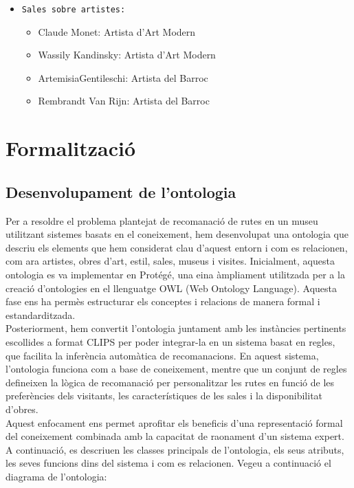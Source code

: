 \documentclass[a4paper]{article}
\begin{document}
	\begin{itemize}
		\item \texttt{Sales sobre artistes: } 
		\begin{itemize}
			\item Claude Monet: Artista d'Art Modern
			\item Wassily Kandinsky: Artista d'Art Modern
			\item ArtemisiaGentileschi: Artista del Barroc
			\item Rembrandt Van Rijn: Artista del Barroc
		\end{itemize}
	\end{itemize}
	
	\newpage
	\section{Formalització}
	
	\subsection{Desenvolupament de l'ontologia}
	
	Per a resoldre el problema plantejat de recomanació de rutes en un museu utilitzant sistemes basats en el coneixement, hem desenvolupat una ontologia que descriu els elements que hem considerat clau d’aquest entorn i com es relacionen, com ara artistes, obres d’art, estil, sales, museus i visites. Inicialment, aquesta ontologia es va implementar en Protégé, una eina àmpliament utilitzada per a la creació d’ontologies en el llenguatge OWL (Web Ontology Language). Aquesta fase ens ha permès estructurar els conceptes i relacions de manera formal i estandarditzada. \\
	
	Posteriorment, hem convertit l’ontologia juntament amb les instàncies pertinents escollides a format CLIPS per poder integrar-la en un sistema basat en regles, que facilita la inferència automàtica de recomanacions. En aquest sistema, l’ontologia funciona com a base de coneixement, mentre que un conjunt de regles defineixen la lògica de recomanació per personalitzar les rutes en funció de les preferències dels visitants, les característiques de les sales i la disponibilitat d’obres. \\
	
	Aquest enfocament ens permet aprofitar els beneficis d’una representació formal del coneixement combinada amb la capacitat de raonament d’un sistema expert. A continuació, es descriuen les classes principals de l’ontologia, els seus atributs, les seves funcions dins del sistema i com es relacionen. Vegeu a continuació el diagrama de l'ontologia: \\
	
\end{document}

